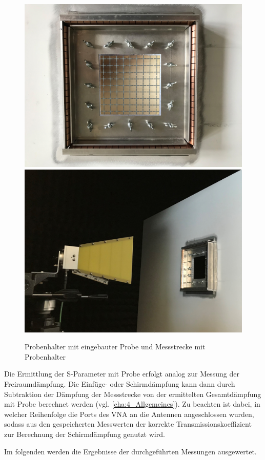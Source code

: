 \begin{figure}[ht]
    \centering
    \includegraphics[height=.2\textheight, draft = false]{Abbildungen/Kapitel4/Probenhalter.jpg}
    \hspace{1cm}
    \includegraphics[height=.2\textheight, draft = false]{Abbildungen/Kapitel4/IMG_5675_trimmed.jpg}
    \caption{Probenhalter mit eingebauter Probe und Messstrecke mit Probenhalter}
    \label{fig:4_Probenhalter_mit_Probe}
\end{figure}


Die Ermittlung der S-Parameter mit Probe erfolgt analog zur Messung der Freiraumdämpfung. Die Einfüge- oder Schirmdämpfung kann dann durch Subtraktion der Dämpfung der Messstrecke von der ermittelten Gesamtdämpfung mit Probe berechnet werden (vgl. \Abschnitt\ref{cha:4_Allgemeines}). Zu beachten ist dabei, in welcher Reihenfolge die Ports des VNA an die Antennen angeschlossen wurden, sodass aus den gespeicherten Messwerten der korrekte Transmissionskoeffizient zur Berechnung der Schirmdämpfung genutzt wird.
\par
\vspace{\linespace}
Im folgenden \Abschnitt werden die Ergebnisse der durchgeführten Messungen ausgewertet.














